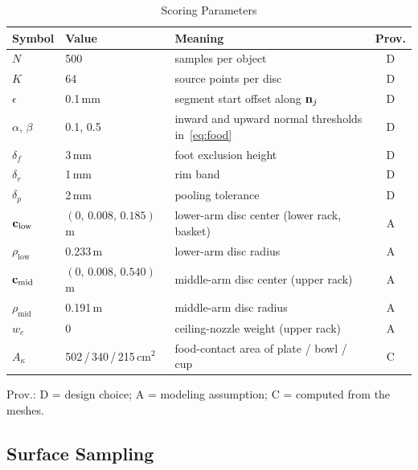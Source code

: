 \begin{table}[t]
\caption{Scoring Parameters}
\label{tab:scoring-params}
\centering
\footnotesize
\setlength{\tabcolsep}{3pt}
\begin{tabular}{@{}llp{3.3cm}c@{}}
\toprule
Symbol & Value & Meaning & Prov.\\
\midrule
$N$ & 500 & samples per object & D\\
$K$ & 64 & source points per disc & D\\
$\epsilon$ & 0.1\,mm & segment start offset along $\mathbf{n}_j$ & D\\
$\alpha$, $\beta$ & 0.1, 0.5 & inward and upward normal thresholds in~\eqref{eq:food} & D\\
$\delta_f$ & 3\,mm & foot exclusion height & D\\
$\delta_r$ & 1\,mm & rim band & D\\
$\delta_p$ & 2\,mm & pooling tolerance & D\\
$\mathbf{c}_{\mathrm{low}}$ & $(0,\,0.008,\,0.185)$\,m & lower-arm disc center (lower rack, basket) & A\\
$\rho_{\mathrm{low}}$ & 0.233\,m & lower-arm disc radius & A\\
$\mathbf{c}_{\mathrm{mid}}$ & $(0,\,0.008,\,0.540)$\,m & middle-arm disc center (upper rack) & A\\
$\rho_{\mathrm{mid}}$ & 0.191\,m & middle-arm disc radius & A\\
$w_c$ & 0 & ceiling-nozzle weight (upper rack) & A\\
$A_\kappa$ & 502\,/\,340\,/\,215\,cm$^2$ & food-contact area of plate / bowl / cup & C\\
\bottomrule
\end{tabular}

\vspace{3pt}
{\footnotesize Prov.: D = design choice; A = modeling assumption; C = computed from the meshes.\par}
\end{table}

\subsection{Surface Sampling}
\label{sec:scoring-sampling}

